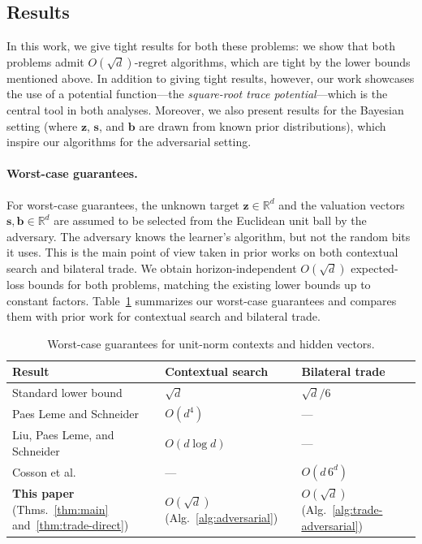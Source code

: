 \documentclass[11pt]{article}
\newcommand{\R}{\mathbb R}
\newcommand{\Rbb}{\mathbb R}
\newcommand{\bz}{\boldsymbol z}
\begin{document}
\subsection{Results}

In this work, we give tight results for both these problems: we show
that both problems admit $O(\sqrt{d})$-regret algorithms, which are
tight {by the lower bounds mentioned above}. In addition to giving tight
results, however, our work showcases the use of a potential
function---the \emph{square-root trace potential}---which is the
{central tool in both analyses}. Moreover, we also present results
for the Bayesian setting (where $\bz$, $\boldsymbol s$, and $\boldsymbol b$ are drawn from known prior
distributions), which inspire our algorithms for the adversarial
setting.

\paragraph{Worst-case guarantees.} For worst-case guarantees, the
unknown target $\bz\in \Rbb^d$ and the valuation vectors
$\boldsymbol s,\boldsymbol b\in\R^d$ are assumed to be selected from
the Euclidean unit ball by the adversary. The adversary knows the
learner's algorithm, but not the random bits it uses. This is the main
point of view taken in prior works on both contextual search and
bilateral trade. We obtain horizon-independent $O(\sqrt d)$
expected-loss bounds for both problems, matching the existing lower
bounds up to constant factors. Table~\ref{tab:results} summarizes our
worst-case guarantees and compares them with {prior work} for
contextual search and bilateral
trade. 

\begin{table}[htbp]
\centering
\renewcommand{\arraystretch}{1.2}
\begin{tabular}{lll}
\hline
Result & Contextual search & Bilateral trade \\
\hline
Standard lower bound \cite{LPS21,CFGLPR26}& $\sqrt d$  & ${\sqrt d/6}$ \\
Paes Leme and Schneider \cite{PLS18} & $O(d^4)$ & --- \\
Liu, Paes Leme, and Schneider \cite{LPS21} & $O(d\log d)$ & --- \\
Cosson et al.~\cite{CFGLPR26} & --- & $O(d\,6^d)$ \\
\textbf{This paper} (Thms.~\ref{thm:main} and~\ref{thm:trade-direct}) & $O(\sqrt d)$ (Alg.~\ref{alg:adversarial})& $O(\sqrt d)$ (Alg.~\ref{alg:trade-adversarial}) \\
\hline
\end{tabular}
\caption{Worst-case guarantees for unit-norm contexts and hidden vectors.}
\label{tab:results}
\end{table}
\end{document}
